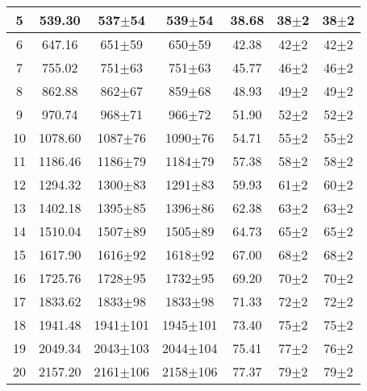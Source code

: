 \begin{table}
\begin{tabular}{|c|c|c|c|c|c|c|}
5&539.30&537$\pm$54&539$\pm$54&38.68&38$\pm$2&38$\pm$2\\ \hline 
6&647.16&651$\pm$59&650$\pm$59&42.38&42$\pm$2&42$\pm$2\\ \hline 
7&755.02&751$\pm$63&751$\pm$63&45.77&46$\pm$2&46$\pm$2\\ \hline 
8&862.88&862$\pm$67&859$\pm$68&48.93&49$\pm$2&49$\pm$2\\ \hline 
9&970.74&968$\pm$71&966$\pm$72&51.90&52$\pm$2&52$\pm$2\\ \hline 
10&1078.60&1087$\pm$76&1090$\pm$76&54.71&55$\pm$2&55$\pm$2\\ \hline 
11&1186.46&1186$\pm$79&1184$\pm$79&57.38&58$\pm$2&58$\pm$2\\ \hline 
12&1294.32&1300$\pm$83&1291$\pm$83&59.93&61$\pm$2&60$\pm$2\\ \hline 
13&1402.18&1395$\pm$85&1396$\pm$86&62.38&63$\pm$2&63$\pm$2\\ \hline 
14&1510.04&1507$\pm$89&1505$\pm$89&64.73&65$\pm$2&65$\pm$2\\ \hline 
15&1617.90&1616$\pm$92&1618$\pm$92&67.00&68$\pm$2&68$\pm$2\\ \hline 
16&1725.76&1728$\pm$95&1732$\pm$95&69.20&70$\pm$2&70$\pm$2\\ \hline 
17&1833.62&1833$\pm$98&1833$\pm$98&71.33&72$\pm$2&72$\pm$2\\ \hline 
18&1941.48&1941$\pm$101&1945$\pm$101&73.40&75$\pm$2&75$\pm$2\\ \hline 
19&2049.34&2043$\pm$103&2044$\pm$104&75.41&77$\pm$2&76$\pm$2\\ \hline 
20&2157.20&2161$\pm$106&2158$\pm$106&77.37&79$\pm$2&79$\pm$2\\ \hline 
\end{tabular} 
\end{table} 
